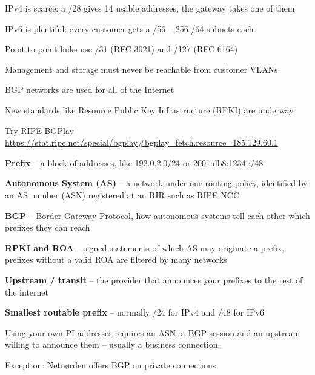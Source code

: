 \documentclass[Screen16to9,17pt]{foils}
\begin{document}
  \begin{list2}
  \item IPv4 is scarce: a /28 gives 14 usable addresses, the gateway takes one of them
  \item IPv6 is plentiful: every customer gets a /56 -- 256 /64 subnets each
  \item Point-to-point links use /31 (RFC 3021) and /127 (RFC 6164)
  \item Management and storage must never be reachable from customer VLANs
  \end{list2}




\begin{list2}
\item BGP networks are used for all of the Internet
\item New standards like Resource Public Key Infrastructure (RPKI) are underway
\item Try RIPE BGPlay \url{https://stat.ripe.net/special/bgplay#bgplay_fetch.resource=185.129.60.1}
\end{list2}



\begin{list2}
\item {\bf Prefix} -- a block of addresses, like 192.0.2.0/24 or 2001:db8:1234::/48
\item {\bf Autonomous System (AS)} -- a network under one routing policy, identified by an AS number (ASN) registered at an RIR such as RIPE NCC
\item {\bf BGP} -- Border Gateway Protocol, how autonomous systems tell each other which prefixes they can reach
\item {\bf RPKI and ROA} -- signed statements of which AS may originate a prefix, prefixes without a valid ROA are filtered by many networks
\item {\bf Upstream / transit} -- the provider that announces your prefixes to the rest of the internet
\item {\bf Smallest routable prefix} -- normally /24 for IPv4 and /48 for IPv6
\item Using your own PI addresses requires an ASN, a BGP session and an upstream willing to announce them -- usually a business connection.
\item Exception: Netnørden offers BGP on private connections 
\end{list2}
\end{document}
